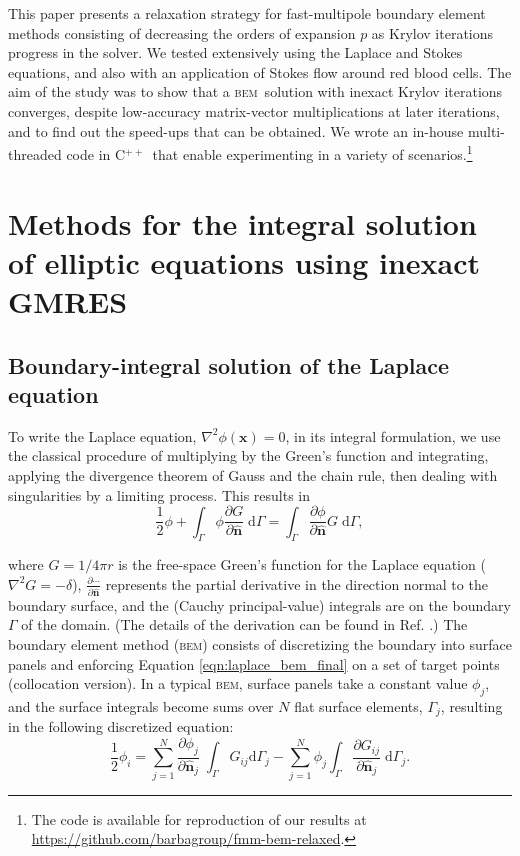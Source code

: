 \documentclass[smallcondensed,final]{svjour3}
\newcommand{\bem}{\textsc{bem}\xspace}
\newcommand{\cpp}{C$^{++}$}
\newcommand{\di}[1]{\text{d}#1}
\newcommand{\partiald}[2]{\frac{\partial #1}{\partial #2}}
\newcommand{\vect}[1]{\mathbf{#1}}
\newcommand{\nhat}{\hat{\mathbf{n}}}
\begin{document}
This paper presents a relaxation strategy for fast-multipole boundary element methods consisting of decreasing the orders of expansion $p$ as Krylov iterations progress in the solver. We tested extensively using the Laplace and Stokes equations, and also with an application of Stokes flow around red blood cells. The aim of the study was to show that a \bem\ solution with inexact Krylov iterations converges, despite low-accuracy matrix-vector multiplications at later iterations, and to find out the speed-ups that can be obtained. We wrote an in-house  multi-threaded code in \cpp\ that enable experimenting in a variety of scenarios.\footnote{The code is available for reproduction of our results at \url{https://github.com/barbagroup/fmm-bem-relaxed}.} 

\section{Methods for the integral solution of elliptic equations using inexact {\small GMRES}}

\subsection{Boundary-integral solution of the Laplace equation}

To write the Laplace equation, $\nabla^{2}\phi(\vect{x}) = 0$,  in its integral formulation, we use the classical procedure of multiplying by the Green's function and integrating, applying the divergence theorem of Gauss and the chain rule, then dealing with singularities by a limiting process. This results in
%
\begin{equation}\label{eqn:laplace_bem_final}
	\frac{1}{2}\phi + \int_{\Gamma} \phi\partiald{G}{\nhat}\;\di{\Gamma} = \int_{\Gamma}\partiald{\phi}{\nhat}G\;\di{\Gamma},
\end{equation}

\noindent where $G = 1/4\pi r$ is the free-space Green's function for the Laplace equation ($\nabla^{2}G = -\delta$),  $\partiald{\cdots}{\nhat}$ represents the partial derivative in the direction normal to the boundary surface, and the (Cauchy principal-value) integrals are on the boundary $\Gamma$ of the domain. (The details of the derivation can be found in Ref. \cite{BrebbiaDominguez1992}.) The boundary element method (\bem) consists of discretizing the boundary into surface panels and enforcing Equation \eqref{eqn:laplace_bem_final} on a set of target points (collocation version). In a typical \bem, surface panels take a constant value $\phi_j$, and the surface integrals become sums over $N$ flat surface elements, $\Gamma_j$, resulting in the following discretized equation:
%
\begin{equation}
	\frac{1}{2}\phi_i = \sum_{j=1}^{N} \partiald{\phi_j}{\nhat_j}\;\int_{\Gamma}G_{ij}\di{\Gamma_j} - \sum_{j=1}^{N} \phi_j\int_{\Gamma}\partiald{G_{ij}}{\nhat_j}\;\di{\Gamma_j}.
\end{equation}
\end{document}
